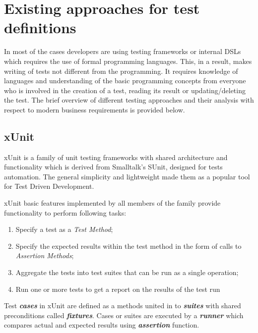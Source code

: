 \section{Existing approaches for test definitions}
\label{sec:testApproaches}
In most of the cases developers are using testing frameworks or internal DSLs which requires the use of formal programming languages. This, in a result, makes writing of tests not different from the programming. It requires knowledge of languages and understanding of the basic programming concepts from everyone who is involved in the creation of a test, reading its result or updating/deleting the test.
The brief overview of different testing approaches and their analysis with respect to modern business requirements is provided below.

\subsection{xUnit}
xUnit is a family of unit testing frameworks with shared architecture and functionality which is derived from Smalltalk's SUnit, designed for tests automation\cite{xunit}\cite{xunitFowler}. The general simplicity and lightweight made them as a popular tool for Test Driven Development\cite{xunitFowler}.

xUnit basic features implemented by all members of the family provide functionality to perform following tasks\cite{xunit}:
\begin{enumerate}
	\item Specify a test as a \textit{Test Method};
	\item Specify the expected results within the test method in the form of calls to \textit{Assertion Methods};
	\item Aggregate the tests into test suites that can be run as a single operation;
	\item Run one or more tests to get a report on the results of the test run
\end{enumerate}

Test \textbf{\textit{cases}} in xUnit are defined as a methods united in to \textbf{\textit{suites}} with shared preconditions called \textbf{\textit{fixtures}}.  Cases or suites are executed by a \textbf{\textit{runner}} which compares actual and expected results using \textbf{\textit{assertion}} function.

